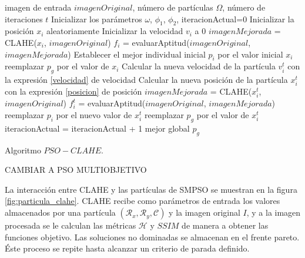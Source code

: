 \documentclass[spanish,twocolumn]{article}
\begin{document}
\begin{algorithm}[H]
    \scriptsize
    \begin{algorithmic}[1]
        \Require imagen de entrada $imagenOriginal$, número de partículas $\Omega$, número de iteraciones $t$
        \State Inicializar los parámetros $\omega$, $\phi_1$, $\phi_2$, iteracionActual=0
            \State Inicializar la posición $x_i$ aleatoriamente
            \State Inicializar la velocidad $v_i$ a 0
            \State ${imagenMejorada}$ = CLAHE(${x_i}$, ${imagenOriginal}$)
            \State ${f_i}$ = evaluarAptitud(${imagenOriginal}$, ${imagenMejorada}$)
            \State Establecer el mejor individual inicial $p_i$ por el valor inicial $x_i$
                \State reemplazar $p_g$ por el valor de $x_i$
            \EndIf
        \EndFor
                \State Calcular la nueva velocidad de la partícula $v^t_i$ con la expresión \eqref{velocidad} de velocidad
                \State Calcular la nueva posición de la partícula $x^t_i$ con la expresión \eqref{posicion} de posición
                \State ${imagenMejorada}$ = CLAHE(${x^t_i}$, ${imagenOriginal}$)
                \State ${f^t_i}$ = evaluarAptitud(${imagenOriginal}$, ${imagenMejorada}$)
                    \State reemplazar $p_i$ por el nuevo valor de $x^t_i$
                \EndIf
                    \State reemplazar $p_g$ por el valor de $x^t_i$
                \EndIf
                \State iteracionActual = iteracionActual + 1
            \EndFor
        \EndWhile
    \Ensure mejor global $p_g$
    \end{algorithmic}
    \caption{Algoritmo $PSO-CLAHE$.}
    \label{alg:pso_clahe}
\end{algorithm}
{\color{red} CAMBIAR A PSO MULTIOBJETIVO}

La interacción entre CLAHE y las partículas de SMPSO se muestran en la figura \ref{fig:particula_clahe}. CLAHE recibe como parámetros de entrada los valores almacenados por una partícula $(\mathcal{R}_x,\mathcal{R}_y, \mathscr{C})$ y la imagen original $I$, y a la imagen procesada se le calculan las métricas $\mathscr{H}$ y $SSIM$ de manera a obtener las funciones objetivo. Las soluciones no dominadas se almacenan en el frente pareto. Éste proceso se repite hasta alcanzar un criterio de parada definido.
\end{document}
